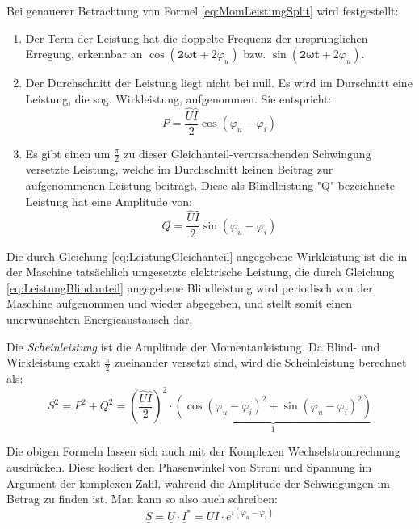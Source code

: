 Bei genauerer Betrachtung von Formel \eqref{eq:MomLeistungSplit} wird festgestellt:
\begin{enumerate}
\item Der Term der Leistung hat die doppelte Frequenz der ursprünglichen Erregung, erkennbar an $\cos(\mathbf{2\omega t} + 2\varphi_u)$ bzw. $\sin(\mathbf{2\omega t} + 2\varphi_u)$.

\item Der Durchschnitt der Leistung liegt nicht bei null. Es wird im Durschnitt eine Leistung, die sog. Wirkleistung, aufgenommen. Sie entspricht:
\begin{equation}
P = \frac{\hat{U}\hat{I}}{2}\cos(\varphi_u-\varphi_i) \label{eq:LeistungGleichanteil}
\end{equation}

\item Es gibt einen um $\frac{\pi}{2}$ zu dieser Gleichanteil-verursachenden Schwingung versetzte Leistung, welche im Durchschnitt keinen Beitrag zur aufgenommenen Leistung beiträgt. Diese als Blindleistung "Q" bezeichnete Leistung hat eine Amplitude von:
\begin{equation}
Q = \frac{\hat{U}\hat{I}}{2}\sin(\varphi_u - \varphi_i) \label{eq:LeistungBlindanteil}
\end{equation}
\end{enumerate}

Die durch Gleichung \eqref{eq:LeistungGleichanteil} angegebene Wirkleistung ist die in der Maschine tatsächlich umgesetzte elektrische Leistung, die durch Gleichung \eqref{eq:LeistungBlindanteil} angegebene Blindleistung wird periodisch von der Maschine aufgenommen und wieder abgegeben, und stellt somit einen unerwünschten Energieaustausch dar.

Die \textit{Scheinleistung} ist die Amplitude der Momentanleistung. Da Blind- und Wirkleistung exakt $\frac{\pi}{2}$ zueinander versetzt sind, wird die Scheinleistung berechnet als:
\begin{equation}
S^2=P^2 + Q^2 = \left(\frac{\hat{U}\hat{I}}{2}\right)^2\cdot \underbrace{(\cos(\varphi_u - \varphi_i)^2 + \sin(\varphi_u - \varphi_i)^2)}_{1}
\label{eq:ScheinleistungPythagoras}
\end{equation}

Die obigen Formeln lassen sich auch mit der Komplexen Wechselstromrechnung ausdrücken. Diese kodiert den Phasenwinkel von Strom und Spannung im Argument der komplexen Zahl, während die Amplitude der Schwingungen im Betrag zu finden ist. Man kann so also auch schreiben:
\begin{equation}
\underline{S} = \underline{U}\cdot\underline{I}^* = UI\cdot e^{i(\varphi_u-\varphi_i)} \label{eq:KomplexS}
\end{equation}

